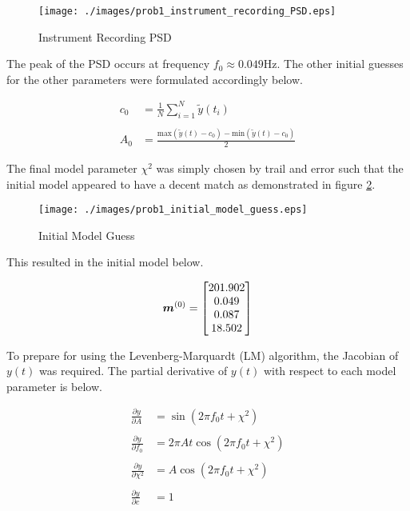 \begin{figure}[h] 
	\centering
	\texttt{[image: ./images/prob1\_instrument\_recording\_PSD.eps]}	
	\caption{Instrument Recording PSD}
	\label{fig: prob1 instrument recording PSD}
\end{figure}
\FloatBarrier

The peak of the PSD occurs at frequency $f_0 \approx 0.049 \unit{\hertz}$. The other initial guesses for the other parameters were formulated accordingly below.

\begin{align*}
	c_0 &= \frac{1}{N}\sum_{i = 1}^{N} \tilde{y}\left(t_i\right) \\
	\\
	A_0 &= \frac{\textrm{max}\left(\tilde{y}(t) - c_0\right) - \textrm{min}\left(\tilde{y}(t) - c_0\right)}{2}
\end{align*}

The final model parameter $\chi^2$ was simply chosen by trail and error such that the initial model appeared to have a decent match as demonstrated in figure \ref{fig: prob1 initial model guess}. 

\begin{figure}[h] 
	\centering
	\texttt{[image: ./images/prob1\_initial\_model\_guess.eps]}
	\caption{Initial Model Guess}
	\label{fig: prob1 initial model guess}
\end{figure}
\FloatBarrier

This resulted in the initial model below.

\begin{align*}
	\boldsymbol{m}^{(0)} = \begin{bmatrix} 201.902 \\ 0.049 \\ 0.087 \\ 18.502 \end{bmatrix}
\end{align*}

To prepare for using the Levenberg-Marquardt (LM) algorithm, the Jacobian of $y(t)$ was required. The partial derivative of $y(t)$ with respect to each model parameter is below. 

\begin{align*}
	\frac{\partial y}{\partial A} &= \sin\left(2 \pi f_0 t + \chi^2 \right) \\
	\\
	\frac{\partial y}{\partial f_0} &= 2 \pi A t \cos\left(2 \pi f_0 t + \chi^2 \right) \\
	\\
	\frac{\partial y}{\partial \chi^2} &= A \cos\left(2 \pi f_0 t + \chi^2 \right) \\
	\\
	\frac{\partial y}{\partial c} &= 1 
\end{align*}

